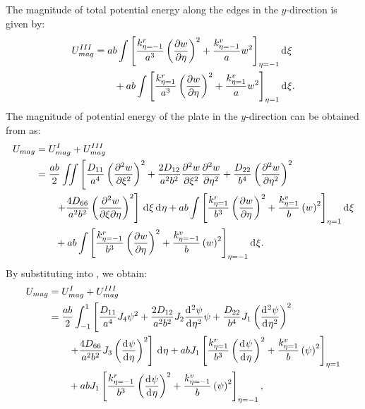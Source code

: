 \documentclass[preprint,12pt]{elsarticle}
\newcommand{\id}{\mathrm{d}\mkern1mu}
\begin{document}
The magnitude of total potential energy along the edges in the $y$-direction is given by:  
%
\begin{equation}\label{eq:poten_energy_edgey2}  
	\begin{split}  
		U^{III}_{mag} &= ab \int \left[ \frac{k^r_{\eta=-1}}{a^3} \left( \frac{\partial w}{\partial \eta} \right)^2 + \frac{k^v_{\eta=-1}}{a} w^2 \right]_{\eta=-1} \id \xi \\  
		&\qquad + ab \int \left[ \frac{k^r_{\eta=1}}{a^3} \left( \frac{\partial w}{\partial \eta} \right)^2 + \frac{k^v_{\eta=1}}{a} w^2 \right]_{\eta=1} \id \xi.  
	\end{split}  
\end{equation} 
% 
The magnitude of potential energy of the plate in the $y$-direction can be obtained from
 as:
%
\begin{equation}\label{eq:poten_energy_toly}
	\begin{split}
		U_{mag}&=U^{I}_{mag}+U^{III}_{mag}\\
		&=\frac{ab}{2} \iint \left[ \frac{D_{11}}{a^4} \left( \frac{\partial^2 w}{\partial \xi^2} \right)^2 + \frac{2 D_{12}}{a^2 b^2} \frac{\partial^2 w}{\partial \xi^2} \frac{\partial^2 w}{\partial \eta^2} + \frac{D_{22}}{b^4} \left( \frac{\partial^2 w}{\partial \eta^2} \right)^2 \right. \\
		&\qquad \left.  + \frac{4 D_{66}}{a^2 b^2}\left( \frac{\partial^2 w}{\partial \xi \partial \eta} \right)^2 \right] \, \id\xi \, \id\eta+ab \int \left[ \frac{k^r_{\eta=1}}{b^3} \left( \frac{\partial w}{\partial \eta} \right)^2 + \frac{k^v_{\eta=1}}{b} \left( w \right)^2 \right]_{\eta=1} \id\xi\\
		&\qquad+ab \int \left[ \frac{k^r_{\eta=-1}}{b^3} \left( \frac{\partial w}{\partial \eta} \right)^2 + \frac{k^v_{\eta=-1}}{b} \left( w \right)^2 \right]_{\eta=-1} \id\xi.
	\end{split}
\end{equation}
%
By substituting  into , we obtain:  
%
\begin{equation}\label{eq:poten_energy_toly2}
	\begin{split}
		U_{mag} &= U^{I}_{mag} + U^{III}_{mag} \\
		&= \frac{ab}{2} \int_{-1}^{1} \left[ \frac{D_{11}}{a^4} J_4 \psi^2 
		+ \frac{2D_{12}}{a^2b^2} J_2 \frac{\id^2\psi }{\id \eta^2} \psi 
		+ \frac{D_{22}}{b^4} J_1 \left(\frac{\id^2\psi }{\id \eta^2} \right)^2 \right. \\
		&\qquad \left. + \frac{4D_{66}}{a^2b^2} J_3 \left(\frac{\id \psi }{\id \eta} \right)^2 \right] \, \id\eta  + abJ_1 \left[ \frac{k^r_{\eta=1}}{b^3} \left( \frac{\id \psi}{\id \eta} \right)^2
		+ \frac{k^v_{\eta=1}}{b}  \left(\psi\right)^2 \right]_{\eta=1} \\
		&\qquad + abJ_1 \left[ \frac{k^r_{\eta=-1}}{b^3} \left( \frac{\id \psi}{\id \eta} \right)^2
		+ \frac{k^v_{\eta=-1}}{b} \left(\psi\right)^2 \right]_{\eta=-1},
	\end{split}
\end{equation}
\end{document}

